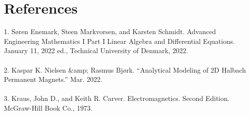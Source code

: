 \documentclass{article}
\begin{document}
\section{References}
 1. Søren Enemark, Steen Markvorsen, and Karsten Schmidt. Advanced Engineering Mathematics I Part I Linear Algebra and Differential Equations. January 11, 2022 ed., Technical University of Denmark, 2022.
\\
\\
2. Kaspar K. Nielsen &amp; Rasmus Bjørk. “Analytical Modeling of 2D Halbach Permanent Magnets.” Mar. 2022. \\
\\
3. Kraus, John D., and Keith R. Carver. Electromagnetics. Second Edition. McGraw-Hill Book Co., 1973. 
\end{document}
